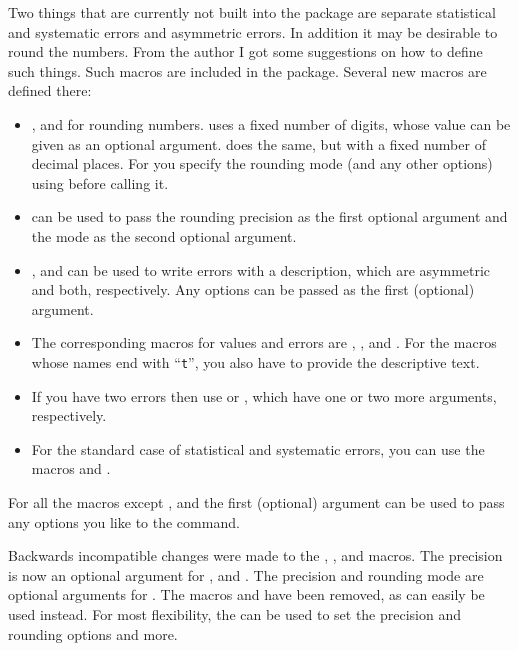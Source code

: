 \documentclass[REPORT=false, UKenglish]{atlasdoc}
\begin{document}
Two things that are currently not built into the  package
are separate statistical and  systematic errors and asymmetric errors.
In addition it may be desirable to round the numbers.
From the author I got some suggestions on how to define such things.
Such macros are included in the  package.
Several new macros are defined there:
\begin{itemize}
  \item {},  and  
    for rounding numbers.
     uses a fixed number of digits,
    whose value can be  given as an optional argument.
     does the same, but with a fixed number of decimal places.
    For  you specify the rounding mode (and any other options)
    using  before calling it.
  \item {} can be used to pass the rounding precision
    as the first optional argument and the mode as the second optional argument.
  \item {},  and 
    can be used to write errors with a description,
    which are asymmetric and both, respectively.
    Any  options can be passed as the first (optional) argument.
  \item The corresponding macros for values and errors are
    , ,  and . For the macros
    whose names end with \enquote{\texttt{t}}, you also have to provide
    the descriptive text.
  \item If you have two errors then use 
    or , which have one or two more arguments, respectively.
  \item For the standard case of statistical and systematic
    errors, you can use the macros  and
    .
\end{itemize}
For all the macros except , 
 and 
the first (optional) argument can be used to pass any options you like to
the  command.

 Backwards incompatible changes were made to the
, ,  and  macros.
The precision is now an optional argument for ,  and .
The precision and rounding mode are optional arguments for .
The macros  and  have been removed,
as  can easily be used instead.
For most flexibility, the  can be used to set the precision and rounding options and more.
\end{document}
